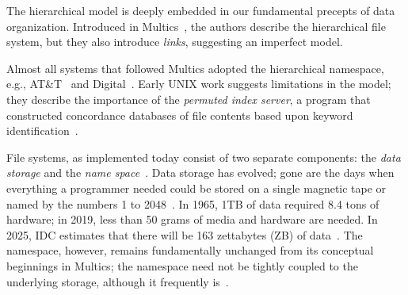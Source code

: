 The hierarchical model is deeply embedded in our fundamental precepts
of data organization. Introduced in Multics~\cite{corbato1965introduction,daley1965general},
the authors describe the hierarchical file system, but they also introduce \textit{links},
suggesting an imperfect model.

Almost all systems that followed Multics adopted the hierarchical namespace, 
e.g., AT\&T~\cite{ritchie1973unix} and Digital~\cite{Spier:1973:EIK:800009.808043}.
Early UNIX work suggests limitations in the model;
they describe the importance of the \textit{permuted index server},
a program that constructed concordance databases of
file contents based upon keyword identification~\cite{ritchie1973unix}.


File systems, as implemented today consist of two separate components: 
the \textit{data storage} and the \textit{name space}~\cite{Seltzer2009,215e74710c2245a59b2ce117f9e74cd7,appuswamy2014building,niazi2017hopsfs}.
Data storage has evolved; gone are the days when everything a programmer
needed could be stored on a single magnetic tape or named by the numbers 1 to 2048~\cite{macdonald1956datafile,wilkes1964programmer}.
In 1965, 1TB of data required 8.4 tons of hardware; in 2019, less than 50 grams of 
media and hardware are needed.  In 2025, IDC estimates that there will be
163 zettabytes (ZB) of data~\cite{reinsel2018data}.
The namespace, however, remains fundamentally unchanged from its conceptual beginnings in
Multics; the namespace need not be tightly coupled to the underlying storage, although
it frequently is~\cite{mckusick1984fast,cao2007ext4,custer1994inside}.

